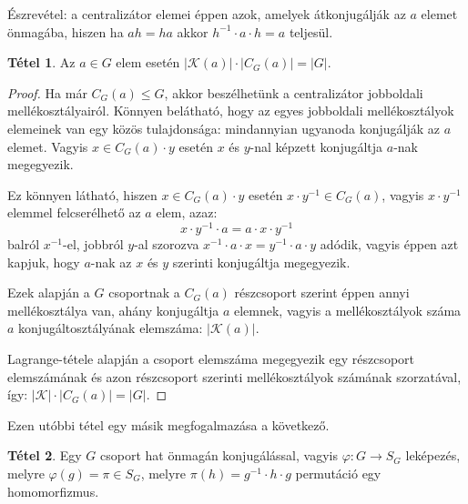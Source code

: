 \documentclass[12pt]{book}
\theoremstyle{plain} %
\theoremstyle{definition} %
\newtheorem{theo/}{Tétel}[section]
\newenvironment{theo}
  {\renewcommand{\qedsymbol}{$\clubsuit$}%
   \pushQED{\qed}\begin{theo/}}
  {\popQED\end{theo/}}
\theoremstyle{remark}
\renewcommand\qedsymbol{$\blacksquare$}
\numberwithin{equation}{section}  %
\begin{document}
	Észrevétel: a centralizátor elemei éppen azok, amelyek átkonjugálják az $a$ elemet önmagába, hiszen ha $ah = ha$ akkor $h^{-1}\cdot a \cdot h = a$ teljesül.
	
	\begin{theo}\label{konjcentr}
		Az $a\in G$ elem esetén $|\mathcal{K}(a)| \cdot |C_G(a)| = |G|$.
	\end{theo}

	\begin{proof}
		Ha már $C_G(a)\leq G$, akkor beszélhetünk a centralizátor jobboldali mellékosztályairól. Könnyen belátható, hogy az egyes jobboldali mellékosztályok elemeinek van egy közös tulajdonsága: mindannyian ugyanoda konjugálják az $a$ elemet. Vagyis $x\in C_G(a)\cdot y$ esetén $x$ és $y$-nal képzett konjugáltja $a$-nak megegyezik.
		
		Ez könnyen látható, hiszen $x\in C_G(a)\cdot y$ esetén $x\cdot y^{-1} \in C_G(a)$, vagyis $x\cdot y^{-1}$ elemmel felcserélhető az $a$ elem, azaz:
		\[ x\cdot y^{-1} \cdot a = a \cdot x \cdot y^{-1}  \]
		balról $x^{-1}$-el, jobbról $y$-al szorozva $x^{-1}\cdot a \cdot x = y^{-1} \cdot a \cdot y$ adódik, vagyis éppen azt kapjuk, hogy $a$-nak az $x$ és $y$ szerinti konjugáltja megegyezik.
		
		Ezek alapján a $G$ csoportnak a $C_G(a)$ részcsoport szerint éppen annyi mellékosztálya van, ahány konjugáltja $a$ elemnek, vagyis a mellékosztályok száma $a$ konjugáltosztályának elemszáma: $|\mathcal{K}(a)|$. 
		
		Lagrange-tétele alapján a csoport elemszáma megegyezik egy részcsoport elemszámának és azon részcsoport szerinti mellékosztályok számának szorzatával, így: $|\mathcal{K}|\cdot |C_G(a)| = |G|$.
	\end{proof}

	Ezen utóbbi tétel egy másik megfogalmazása a következő.
	
	\begin{theo}
		Egy $G$ csoport hat önmagán konjugálással, vagyis $\varphi\colon G\to S_G$ leképezés, melyre $\varphi(g) = \pi\in S_G$, melyre $\pi(h) = g^{-1}\cdot h \cdot g$ permutáció egy homomorfizmus.
	\end{theo}
\end{document}
